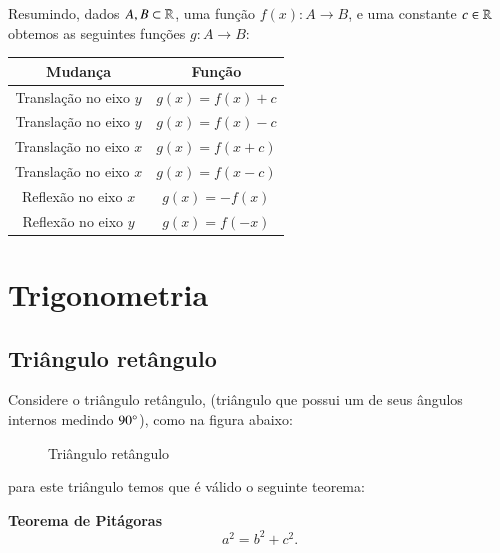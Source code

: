  Resumindo, dados $A, B \subset \mathbb{R}$, uma função $f(x): A \to B$, e uma constante $c \in \mathbb{R}$ obtemos as seguintes funções $g: A \to B$:
  \begin{table}[H]
 \centering
 \begin{tabular}{|c|c|} \hline
 \rowcolor{cinza}
  Mudança & Função \\\hline
  Translação no eixo $y$ & $g(x)= f(x)+ c$ \\\hline
  Translação no eixo $y$ & $g(x)= f(x)- c$ \\\hline
  Translação no eixo $x$ & $g(x)= f(x+ c)$ \\\hline
  Translação no eixo $x$ & $g(x)= f(x- c)$ \\\hline
  Reflexão no eixo $x$ & $g(x)= -f(x)$ \\\hline
  Reflexão no eixo $y$ & $g(x)= f(-x)$ \\\hline
 \end{tabular}
\end{table}

  \newpage
  \section{Trigonometria}

 \subsection{Triângulo retângulo}

  Considere o triângulo retângulo, (triângulo que possui um de seus ângulos internos medindo $90 \degree$), como na figura abaixo:
  \begin{figure}[H]
   \centering
   \caption{Triângulo retângulo}
  \end{figure}
 para este triângulo temos que é válido o seguinte teorema:

 \vskip0.3cm

\colorbox{azul}{
 \begin{minipage}{0.9\linewidth}
 \begin{center}
 \textbf{Teorema de Pitágoras}
  \[a^2= b^2 + c^2.\]
 \end{center}
 \end{minipage}}


